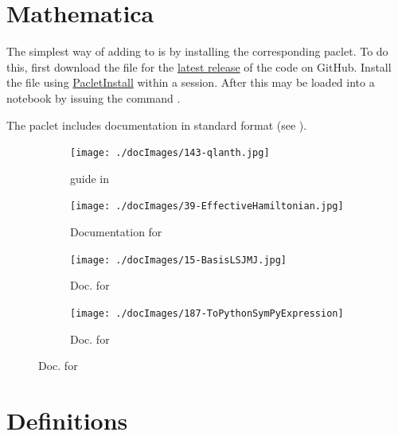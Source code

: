 \documentclass[11pt, twoside,openright]{article}
\begin{document}
\section{Mathematica }\label{section:paclet}


The simplest way of adding \qlanth to \mathematica is by installing the corresponding paclet. To do this, first download the  file for the \href{https://github.com/zia-lab/qlanth/releases}{latest release} of the code on GitHub. Install the  file using \href{https://reference.wolfram.com/language/ref/PacletInstall.html.en}{PacletInstall} within a \mathematica session. After this \qlanth may be loaded into a notebook by issuing the command .

The paclet includes documentation in standard \mathematica format (see ).

\begin{figure}
	\centering
	\begin{subfigure}{0.45\textwidth}
        \centering
		\texttt{[image: ./docImages/143-qlanth.jpg]}	
		\caption{\qlanth guide in \mathematica}
		\label{fig:mathematica-docs}
    \end{subfigure}
	\begin{subfigure}{0.45\textwidth}
        \centering
		\texttt{[image: ./docImages/39-EffectiveHamiltonian.jpg]}	
		\caption{Documentation for }
		\label{fig:mathematica-docs-hammatrix}
    \end{subfigure}
    
    \vspace{1cm} 
    
	\begin{subfigure}{0.45\textwidth}
        \centering
		\texttt{[image: ./docImages/15-BasisLSJMJ.jpg]}	
		\caption{Doc. for }
		\label{fig:mathematica-docs-basislsjmj}
    \end{subfigure}
	\begin{subfigure}{0.45\textwidth}
        \centering
		\texttt{[image: ./docImages/187-ToPythonSymPyExpression]}	
		\caption{Doc. for }
		\label{fig:mathematica-docs2}
    \end{subfigure}
\end{figure}


\section{Definitions}\label{section:definitions} 
\end{document}
